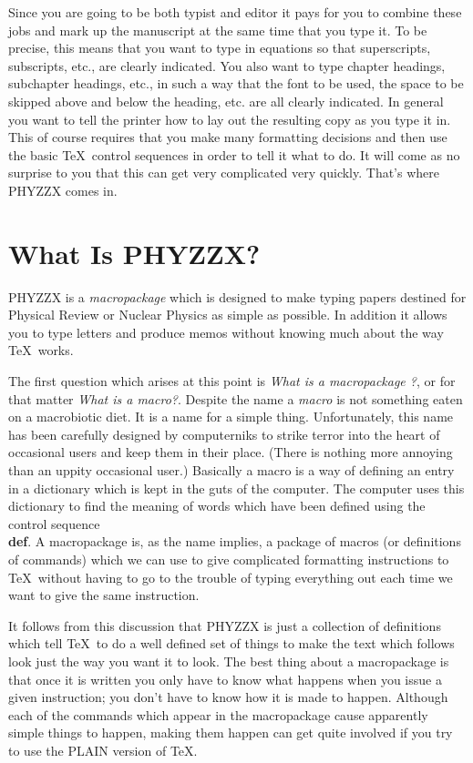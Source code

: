 Since you are going to be both typist and editor it pays for
you to combine these jobs and mark up the manuscript at the
same time that you type it.
To be precise, this means that you want to type in equations
so that superscripts, \break \eject \noindent
subscripts, etc., are clearly indicated.
You also want to type chapter headings, subchapter headings, etc.,
in such a way that the font to be used, the space to be skipped
above and below the heading, etc. are all clearly indicated.
In general you want to tell the printer how to lay out the
resulting copy as you type it in.
This of course requires that you make many formatting decisions
and then use the basic \TeX\ control sequences in order to tell
it what to do.
It will come as no surprise to you that this can get very
complicated very quickly.
That's where PHYZZX comes in.
 
\section{What Is PHYZZX?}
 
PHYZZX is a {\it macropackage} which is designed to make typing papers
destined for Physical Review or Nuclear Physics as simple as possible.
In addition it allows you to type letters and produce memos without
knowing much about the way \TeX\ works.
 
The first question which arises at this point is {\it What is a
macropackage ?}, or for that matter {\it What is a macro?}.
Despite the name a {\it macro} is not something eaten on a
macrobiotic diet.
It is a name for a simple thing.
Unfortunately, this name has
been carefully designed by computerniks
to strike terror into the heart of occasional users and keep them
in their place.  (There is nothing more annoying than an
uppity occasional user.)
Basically a macro is a way of defining an entry in a dictionary
which is kept in the guts of the computer.
The computer uses this dictionary to
find the meaning of words which have been defined
using the control sequence {\bf \\def}.
A macropackage is, as the name implies, a package of macros (or
definitions of commands) which we can use to give complicated
formatting instructions to \TeX\ without having to go
to the trouble of typing everything out each time we want to
give the same instruction.
 
It follows from this discussion that PHYZZX is just a collection
of definitions which tell \TeX\ to do a well defined set of things
to make the text which follows look just the way you want it to look.
The best thing about a macropackage is that once it is written
you only have to know what happens when you
issue a given instruction;
you don't have to know how it is made to happen.
Although each of the commands which appear in the macropackage
cause apparently simple things to happen, making them happen can
get quite involved if you try to use the PLAIN version of \TeX .
 
